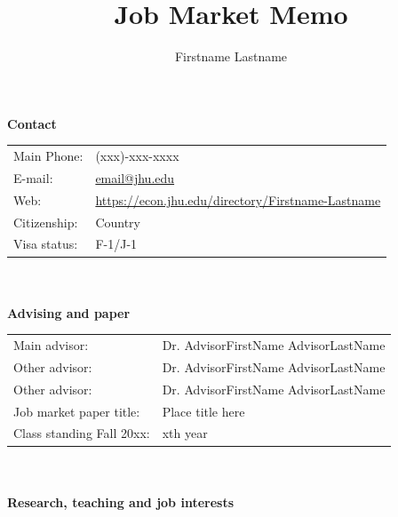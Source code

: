 \documentclass[12pt]{article}
\begin{document}
\title {Job Market Memo}
\author {Firstname Lastname}
\date {}
\maketitle
\textbf{\large{Contact}}\vspace{3mm} \\
\begin{tabular}{ll}
Main Phone: & (xxx)-xxx-xxxx\vspace{1mm}\\
E-mail: & \href{mailto:email@jhu.edu}{email@jhu.edu}\vspace{1mm}\\
Web: & \href{https://econ.jhu.edu/directory/Firstname-Lastname}{https://econ.jhu.edu/directory/Firstname-Lastname} \vspace{1mm}\\
Citizenship: & Country\vspace{1mm}\\
Visa status: & F-1/J-1\vspace{1mm}\\
\end{tabular}
\\
\\
\textbf{\large{Advising and paper}}\vspace{3mm} \\
\begin{tabular}{l p{5in}}
Main advisor: & Dr. AdvisorFirstName AdvisorLastName\vspace{1mm}\\
Other advisor: & Dr. AdvisorFirstName AdvisorLastName\vspace{1mm}\\
Other advisor: & Dr. AdvisorFirstName AdvisorLastName\vspace{1mm}\\
Job market paper title: & Place title here\vspace{1mm}\\
Class standing Fall 20xx: & xth year\vspace{1mm}\\
\end{tabular}
\\
\\
\textbf{\large{Research, teaching and job interests}}\vspace{3mm} \\
\end{document}
